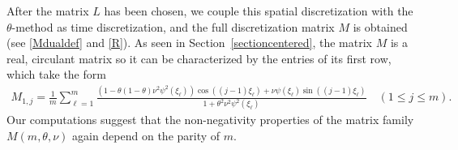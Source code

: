 \documentclass[a4paper]{article}
\begin{document}
After the matrix $L$ has been chosen, we couple this spatial discretization with the $\theta$-method as time
discretization, and the full discretization matrix $M$ is obtained (see \eqref{Mdualdef} and \eqref{R}).
As seen in Section~\ref{sectioncentered}, the matrix $M$ is a real, circulant matrix so it can be characterized by the entries of its first row,
which take the form
\begin{align}\label{M1j_FD}
	  M_{1,j}  = \frac{1}{m} \sum_{\ell=1}^{m} \frac{\left(1-\theta(1-\theta)\nu^2\psi^2(\xi_\ell)\right)
  \cos((j-1)\xi_\ell) + \nu \psi(\xi_\ell)\sin((j-1)\xi_\ell)}{1+\theta^2\nu^2 \psi^2(\xi_\ell)} \quad (1\le j \le m).
\end{align}
Our computations suggest that the non-negativity properties of the matrix family $M(m,\theta,\nu)$ again
depend on the parity of $m$.
\end{document}
